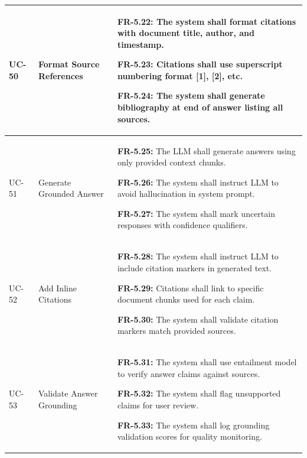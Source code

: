 \begin{longtable}{|>{\raggedright\arraybackslash}p{}|>{\raggedright\arraybackslash}p{}|>{\raggedright\arraybackslash}p{}|}
UC-50 & Format Source References &
\begin{frequirements}
\item \textbf{FR-5.22:} The system shall format citations with document title, author, and timestamp.
\item \textbf{FR-5.23:} Citations shall use superscript numbering format [1], [2], etc.
\item \textbf{FR-5.24:} The system shall generate bibliography at end of answer listing all sources.
\end{frequirements} \\
\hline

UC-51 & Generate Grounded Answer &
\begin{frequirements}
\item \textbf{FR-5.25:} The LLM shall generate answers using only provided context chunks.
\item \textbf{FR-5.26:} The system shall instruct LLM to avoid hallucination in system prompt.
\item \textbf{FR-5.27:} The system shall mark uncertain responses with confidence qualifiers.
\end{frequirements} \\
\hline

UC-52 & Add Inline Citations &
\begin{frequirements}
\item \textbf{FR-5.28:} The system shall instruct LLM to include citation markers in generated text.
\item \textbf{FR-5.29:} Citations shall link to specific document chunks used for each claim.
\item \textbf{FR-5.30:} The system shall validate citation markers match provided sources.
\end{frequirements} \\
\hline

UC-53 & Validate Answer Grounding &
\begin{frequirements}
\item \textbf{FR-5.31:} The system shall use entailment model to verify answer claims against sources.
\item \textbf{FR-5.32:} The system shall flag unsupported claims for user review.
\item \textbf{FR-5.33:} The system shall log grounding validation scores for quality monitoring.
\end{frequirements} \\
\hline


\end{longtable}
